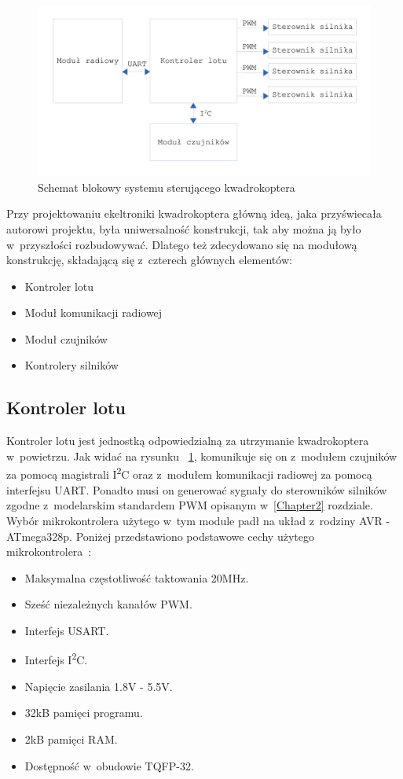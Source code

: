 \begin{figure}[H]
	\centering
	\includegraphics[scale=0.1]{Pictures/QuadroSchematIdeowy.png}
	\caption[Schemat blokowy kwadrokoptera]{Schemat blokowy systemu sterującego kwadrokoptera}
	\label{fig:QuadroSchematIdeowy}
\end{figure}

Przy projektowaniu ekeltroniki kwadrokoptera główną ideą, jaka przyświecała autorowi projektu, była uniwersalność konstrukcji, tak aby można ją było w~przyszłości rozbudowywać. Dlatego też zdecydowano się na modułową konstrukcję, składającą się z~czterech głównych elementów:
\begin{itemize}
	\item Kontroler lotu
	\item Moduł komunikacji radiowej
	\item Moduł czujników
	\item Kontrolery silników
\end{itemize}

\subsection{Kontroler lotu}
Kontroler lotu jest jednostką odpowiedzialną za utrzymanie kwadrokoptera w~powietrzu. Jak widać na rysunku ~\ref{fig:QuadroSchematIdeowy}, komunikuje się on z~modułem czujników za pomocą magistrali I\textsuperscript{2}C oraz z~modułem komunikacji radiowej za pomocą interfejsu UART. Ponadto musi on generować sygnały do sterowników silników zgodne z~modelarskim standardem PWM opisanym w~\ref{Chapter2} rozdziale. Wybór mikrokontrolera użytego w~tym module padł na układ z~rodziny AVR - ATmega328p. Poniżej przedstawiono podstawowe cechy użytego mikrokontrolera~\cite{ds_atmega328p}:

\begin{itemize}
	\item Maksymalna częstotliwość taktowania 20MHz.
	\item Sześć niezależnych kanałów PWM.
	\item Interfejs USART.
	\item Interfejs I\textsuperscript{2}C.
	\item Napięcie zasilania 1.8V - 5.5V.
	\item 32kB pamięci programu.
	\item 2kB pamięci RAM.
	\item Dostępność w~obudowie TQFP-32.
\end{itemize}

